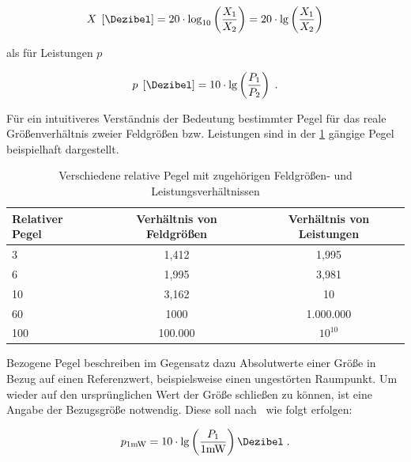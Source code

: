 \begin{equation}
    X \; \left[\si{\Dezibel}\right] = 20 \cdot \log_{10} \left( \frac{X_1}{X_2} \right) = 20 \cdot \lg \left( \frac{X_1}{X_2} \right) \label{eq:2_Relativer_Pegel_Feldgroessen}
\end{equation}

als für Leistungen $p$

\begin{equation}
    p \; \left[\si{\Dezibel}\right] = 10 \cdot \lg \left( \frac{P_1}{P_2} \right) \; \text{.} \label{eq:2_Relativer_Pegel_Leistung}
\end{equation}

Für ein intuitiveres Verständnis der Bedeutung bestimmter Pegel für das reale Größenverhältnis zweier Feldgrößen bzw. Leistungen sind in der \Tabelle\ref{tab:2_Relative_Pegel} gängige Pegel beispielhaft dargestellt.

\begin{table}[ht]
\renewcommand{\arraystretch}{1.1}
\centering
\caption{Verschiedene relative Pegel mit zugehörigen Feldgrößen- und Leistungsverhältnissen}
\vspace{\tablespace}
\begin{tabular}{l c c}
    \toprule
    \textbf{Relativer Pegel} \boldmath{$\left(\si{\Dezibel}\right)$} & \textbf{Verhältnis von Feldgrößen} & \textbf{Verhältnis von Leistungen} \\
    \midrule
    3   &   1,412   &   1,995   \\
    6   &   1,995   &   3,981   \\
    10  &   3,162   &   10      \\
    60  &   1000    &   1.000.000 \\
    100 &   100.000  &   $10^{10}$ \\
    \bottomrule
\end{tabular}
\label{tab:2_Relative_Pegel}
\end{table}

Bezogene Pegel beschreiben im Gegensatz dazu Absolutwerte einer Größe in Bezug auf einen Referenzwert, beispielsweise einen ungestörten Raumpunkt. Um wieder auf den ursprünglichen Wert der Größe schließen zu können, ist eine Angabe der Bezugsgröße notwendig. Diese soll nach~\cite{IEC60027-3} wie folgt erfolgen: 

\begin{equation}
    p_{1 \si{\milli\watt}} = 10 \cdot \lg \left( \frac{P_1}{1 \si{\milli\watt}}\right) \si{\Dezibel} \; .
\end{equation}


